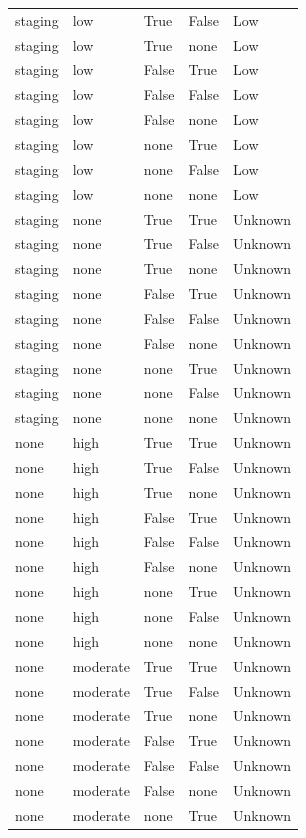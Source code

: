\begin{longtable}{@{}lllll@{}}
staging & low & True & False & Low \\
staging & low & True & none & Low \\
staging & low & False & True & Low \\
staging & low & False & False & Low \\
staging & low & False & none & Low \\
staging & low & none & True & Low \\
staging & low & none & False & Low \\
staging & low & none & none & Low \\
staging & none & True & True & Unknown \\
staging & none & True & False & Unknown \\
staging & none & True & none & Unknown \\
staging & none & False & True & Unknown \\
staging & none & False & False & Unknown \\
staging & none & False & none & Unknown \\
staging & none & none & True & Unknown \\
staging & none & none & False & Unknown \\
staging & none & none & none & Unknown \\
none & high & True & True & Unknown \\
none & high & True & False & Unknown \\
none & high & True & none & Unknown \\
none & high & False & True & Unknown \\
none & high & False & False & Unknown \\
none & high & False & none & Unknown \\
none & high & none & True & Unknown \\
none & high & none & False & Unknown \\
none & high & none & none & Unknown \\
none & moderate & True & True & Unknown \\
none & moderate & True & False & Unknown \\
none & moderate & True & none & Unknown \\
none & moderate & False & True & Unknown \\
none & moderate & False & False & Unknown \\
none & moderate & False & none & Unknown \\
none & moderate & none & True & Unknown \\

\end{longtable}
